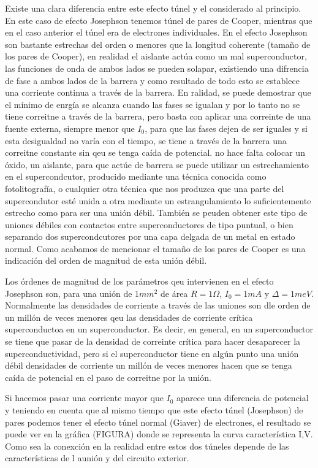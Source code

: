 Existe una clara diferencia entre este efecto túnel y el considerado al principio. En este caso de efecto Josephson tenemos túnel de pares de Cooper, mientras que en el caso anterior el túnel era de electrones individuales. En el efecto Josephson son bastante estrechas del orden o menores que la longitud coherente (tamaño de los pares de Cooper), en realidad el aislante actúa como un mal superconductor, las funciones de onda de ambos lados se pueden solapar, existiendo una difrencia de fase a ambos lados de la barrera y como resultado de todo esto se establece una corriente continua a través de la barrera. En ralidad, se puede demostrar que el mínimo de enrgía se alcanza cuando las fases se igualan y por lo tanto no se tiene correitne a través de la barrera, pero basta con aplicar una correinte de una fuente externa, siempre menor que $I_0$, para que las fases dejen de ser iguales y si esta desigualdad no varía con el tiempo, se tiene a través de la barrera una correitne constante sin qeu se tenga caída de potencial. no hace falta colocar un óxido, un aislante, para que actúe de barrera se puede utilizar un estrechamiento en el supercondcutor, producido mediante una técnica conocida como fotolitografía, o cualquier otra técnica que nos produzca que una parte del supercondutor esté unida a otra mediante un estrangulamiento lo suficientemente estrecho como para ser una unión débil. También se peuden obtener este tipo de uniones débiles con contactos entre superconductores de tipo puntual, o bien separando dos supercondcutores por una capa delgada de un metal en estado normal. Como acabamos de mencionar el tamaño de los pares de Cooper es una indicación del orden de magnitud de esta unión débil.

Los órdenes de magnitud de los parámetros qeu intervienen en el efecto Josephson son, para una unión de $1mm^2$ de área $R = 1 \Omega$, $I_0 = 1 mA$ y $\Delta = 1meV$. Normalmente las densidades de corriente a través de las uniones son dle orden de un millón de veces menores qeu las densidades de corriente crítica superconductoa en un superconductor. Es decir, en general, en un superconductor se tiene que pasar de la densidad de correinte crítica para hacer desaparecer la superconductividad, pero si el superconductor tiene en algún punto una unión débil densidades de corriente un millón de veces menores hacen que se tenga caída de potencial en el paso de correitne por la unión.

Si hacemos pasar una corriente mayor que $I_0$ aparece una diferencia de potencial y teniendo en cuenta que al mismo tiempo que este efecto túnel (Josephson) de pares podemos tener el efecto túnel normal (Giaver) de electrones, el resultado se puede ver en la gráfica (FIGURA) donde se representa la curva característica I,V. Como sea la conexción en la realidad entre estos dos túneles depende de las características de l aunión y del circuito exterior.

